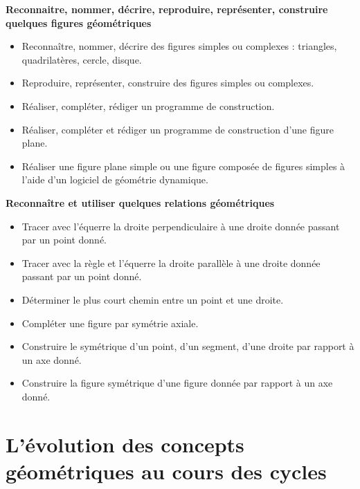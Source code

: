 \begin{prerequis}
\small   {\bf Reconnaitre, nommer, décrire, reproduire, représenter, construire quelques figures géométriques}
   \begin{itemize}
      \item Reconnaître, nommer, décrire des figures simples ou complexes : triangles, quadrilatères, cercle, disque.
      \item Reproduire, représenter, construire des figures simples ou complexes.
      \item Réaliser, compléter, rédiger un programme de construction.
      \item Réaliser, compléter et rédiger un programme de construction d’une figure plane.
      \item Réaliser une figure plane simple ou une figure composée de figures simples à l’aide d’un logiciel de géométrie dynamique.
   \end{itemize}
{\bf Reconnaître et utiliser quelques relations géométriques}     
   \begin{itemize}
      \item Tracer avec l’équerre la droite perpendiculaire à une droite donnée passant par un point donné.
      \item Tracer avec la règle et l’équerre la droite parallèle à une droite donnée passant par un point donné.
      \item Déterminer le plus court chemin entre un point et une droite.
      \item Compléter une figure par symétrie axiale.
      \item Construire le symétrique d’un point, d’un segment, d’une droite par rapport à un axe donné.
      \item Construire la figure symétrique d'une figure donnée par rapport à un axe donné.
   \end{itemize}
\end{prerequis}


\cours


\section{L'évolution des concepts géométriques au cours des cycles}


